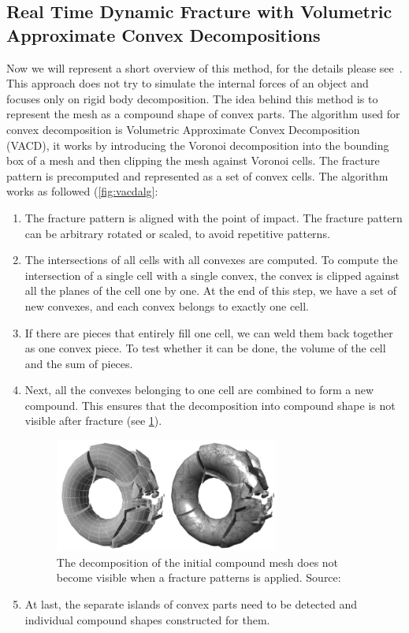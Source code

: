 \subsection{Real Time Dynamic Fracture
with Volumetric Approximate Convex Decompositions}
Now we will represent a short overview of this method, for the details please see~\citet{nvidia}.
This approach does not try to simulate the internal forces of an object and focuses only on rigid body decomposition. The idea behind this method is to represent the mesh as a compound shape of convex parts. The algorithm used for convex decomposition is Volumetric Approximate Convex Decomposition (VACD), it works by introducing the Voronoi decomposition into the bounding box of a mesh and then clipping the mesh against Voronoi cells. The fracture pattern is precomputed and represented as a set of convex cells. The algorithm works as followed (\cref{fig:vacdalg}:
\begin{enumerate}
\item The fracture pattern is aligned with the point of impact. The fracture pattern can be arbitrary rotated or scaled, to avoid repetitive patterns.
\item The intersections of all cells with all convexes are computed.  To compute the intersection of a single cell with a single convex, the convex is clipped against all the planes of the cell one by one. 
At the end of this step, we have a set of new convexes, and each convex belongs to exactly one cell.
\item If there are pieces that entirely fill one cell, we can weld them back together as one convex piece. To test whether it can be done, the volume of the cell and the sum of pieces.
\item Next, all the convexes belonging to one cell are combined to form a new compound. This ensures that the decomposition into compound shape is not visible after fracture (see \cref{fig:vacdfracture}).
\begin{figure}
        \centering
        \includegraphics[width=0.7\textwidth]{img/vacdfracture}
        \caption{The decomposition of the
initial compound mesh does not become visible when a fracture
patterns is applied. Source: \citet{nvidia}}
        \label{fig:vacdfracture}
\end{figure}
\item At last, the separate islands of convex parts need to be detected and individual compound shapes constructed for them.
\end{enumerate}

